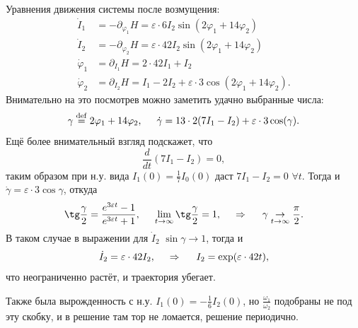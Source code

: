 Уравнения движения системы после возмущения:
\begin{align*}
    \dot{I}_1 &= - \partial_{\varphi_1} H = \varepsilon \cdot 6 I_2 \sin(2 \varphi_1 + 14 \varphi_2)\\ 
    \dot{I}_2 &= - \partial_{\varphi_2} H = \varepsilon \cdot 42 I_2 \sin(2 \varphi_1 + 14 \varphi_2)\\ 
    \dot{\varphi}_1 &= \partial_{I_1} H = 2 \cdot 42 I_1 + I_2 \\
    \dot{\varphi}_2 &= \partial_{I_2} H =I_1 - 2 I_2 + \varepsilon \cdot 3 \cos (2 \varphi_1 + 14 \varphi_2).
\end{align*}
Внимательно на это посмотрев можно заметить удачно выбранные числа:
\begin{equation*}
    \gamma \overset{\mathrm{def}}{=}  2 \varphi_1 + 14 \varphi_2,
    \hspace{5 mm} 
    \dot{\gamma} = 13 \cdot 2 (7 I_1 - I_2) + \varepsilon \cdot 3 \cos (\gamma).
\end{equation*}
Ещё более внимательный взгляд подскажет, что
\begin{equation*}
    \textstyle \frac{d }{d t} (7 I_1 - I_2) = 0,
\end{equation*}
таким образом при н.у. вида $I_1(0)= \frac{1}{7} I_0 (0)$ даст $7 I_1 - I_2 = 0$ $\forall t$. Тогда и $\dot{\gamma} = \varepsilon \cdot 3 \cos \gamma$, откуда
\begin{equation*}
    \tg \frac{\gamma}{2} = \frac{e^{3 \varepsilon t}-1}{e^{3 \varepsilon t}+1},
    \hspace{5 mm} 
    \lim_{t \to \infty} \tg \frac{\gamma}{2} = 1,
    \hspace{0.5cm} \Rightarrow \hspace{0.5cm}
    \gamma \underset{t \to \infty}{\to} \frac{\pi}{2}.
\end{equation*}
В таком случае в выражении для $\dot{I}_2$ $\sin \gamma \to 1$, тогда и
\begin{equation*}
    \dot{I}_2 = \varepsilon \cdot 42 I_2,
    \hspace{0.5cm} \Rightarrow \hspace{0.5cm}
    I_2 = \exp(\varepsilon \cdot 42 t), 
\end{equation*}
что неограниченно растёт, и траектория убегает.


Также была вырожденность с н.у. $I_1 (0) = - \frac{1}{6} I_2 (0)$, но $\frac{\omega_1}{\omega_2}$ подобраны не под эту скобку, и в решение там тор не ломается, решение периодично.


